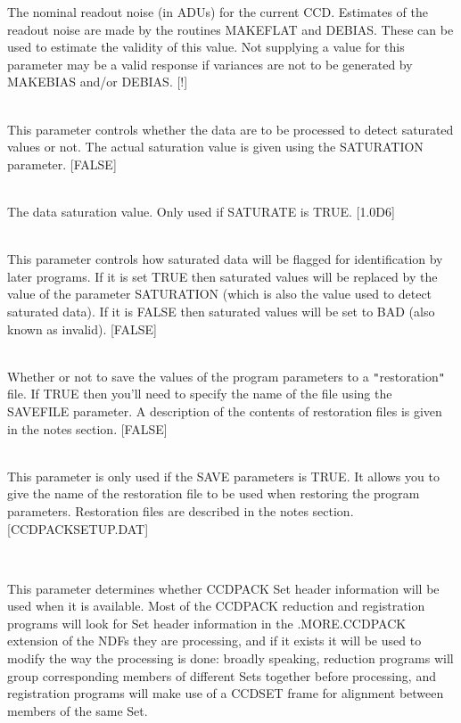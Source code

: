 \documentclass[twoside,11pt]{article}
\newcommand{\htmlref}[2]{#1}
\renewcommand{\_}{\texttt{\symbol{95}}}
\newcommand{\qt}[1]{{\tt "}#1{\tt "}}
\newcommand{\xroutine}[1]{\htmlref{{\sc #1}}{#1}}
\newcommand{\sstsubsection}[1]{ \item[{#1}] \mbox{} \\}
\newcommand{\sstsubsection}[1]{\item[{#1}]}
\begin{document}
{{{      } {
         The nominal readout noise (in ADUs) for the current CCD.
         Estimates of the readout noise are made by the routines
         \xroutine{MAKEFLAT} and \xroutine{DEBIAS}. These can be used to estimate the
         validity of this value. Not supplying a value for this
         parameter may be a valid response if variances are not to be
         generated by \xroutine{MAKEBIAS} and/or \xroutine{DEBIAS}.
         [!]
      }
      \sstsubsection{
         SATURATE = \_LOGICAL (Read)
      } {
         This parameter controls whether the data are to be processed to
         detect saturated values or not. The actual saturation value is
         given using the SATURATION parameter.
         [FALSE]
      }
      \sstsubsection{
         SATURATION = \_DOUBLE (Read)
      } {
         The data saturation value. Only used if SATURATE is TRUE.
         [1.0D6]
      }
      \sstsubsection{
         SETSAT = \_LOGICAL (Read)
      } {
         This parameter controls how saturated data will be flagged for
         identification by later programs. If it is set TRUE then saturated
         values will be replaced by the value of the parameter SATURATION
         (which is also the value used to detect saturated data). If it is
         FALSE then saturated values will be set to BAD (also known as
         invalid).
         [FALSE]
      }
      \sstsubsection{
         SAVE = \_LOGICAL (Read)
      } {
         Whether or not to save the values of the program parameters to a
         \qt{restoration} file. If TRUE then you'll need to specify the name
         of the file using the SAVEFILE parameter. A description of the
         contents of restoration files is given in the notes section.
         [FALSE]
      }
      \sstsubsection{
         SAVEFILE = FILENAME (Read)
      } {
         This parameter is only used if the SAVE parameters is TRUE.
         It allows you to give the name of the restoration file to be used
         when restoring the program parameters. Restoration files are
         described in the notes section.
         [CCDPACK\_SETUP.DAT]
      }
      \sstsubsection{
         USESET = \_LOGICAL (Read)
      } {
         This parameter determines whether CCDPACK Set header information
         will be used when it is available.  Most of the CCDPACK 
         reduction and registration programs will look for Set header
         information in the .MORE.CCDPACK extension of the NDFs they
         are processing, and if it exists it will be used to modify
         the way the processing is done: broadly speaking, reduction 
         programs will group corresponding members of different Sets
         together before processing, and registration programs will
         make use of a CCD\_SET frame for alignment between members
         of the same Set.

}}}
\end{document}
